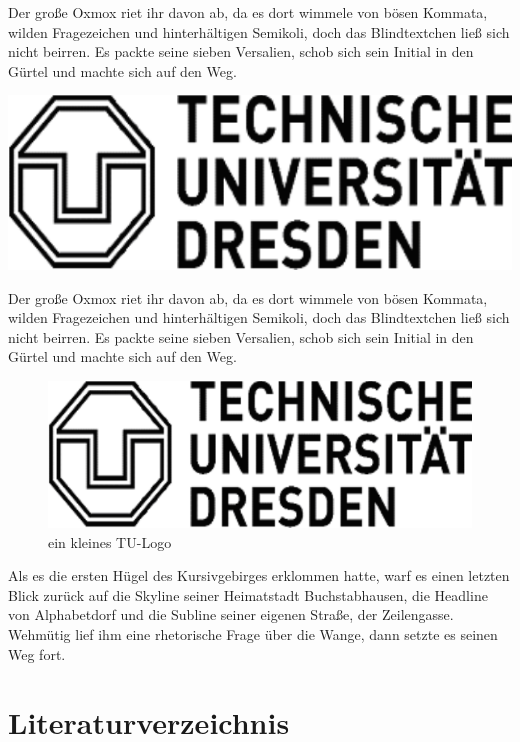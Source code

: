 \documentclass[%
	12pt,%
	a4paper,%
	oneside,%
	liststotoc, idxtotoc, bibtotoc, %
	parskip=half,%
	nochapterprefix,%
	appendixprefix, %
	headings=small,%
]{scrreprt}
\newcommand{\alt}[1]{}%
\begin{document}
Der große Oxmox riet ihr davon ab, da es dort wimmele von bösen Kommata, wilden Fragezeichen und hinterhältigen Semikoli, doch das Blindtextchen ließ sich nicht beirren. Es packte seine sieben Versalien, schob sich sein Initial in den Gürtel und machte sich auf den Weg. 

		\alt{Ich bin das Logo der Technischen Universität Dresden}
		\includegraphics[scale=0.10]{images/tu_logo}%

Der große Oxmox riet ihr davon ab, da es dort wimmele von bösen Kommata, wilden Fragezeichen und hinterhältigen Semikoli, doch das Blindtextchen ließ sich nicht beirren. Es packte seine sieben Versalien, schob sich sein Initial in den Gürtel und machte sich auf den Weg. 

\begin{figure}[htbp]
		\centering
		\alt{Ich bin das Logo der Technischen Universität Dresden}
		\includegraphics[scale=0.25]{images/tu_logo}%
	\caption{ein kleines TU-Logo}%
	\label{fig:kleinestulogo}
\end{figure}

Als es die ersten Hügel des Kursivgebirges erklommen hatte, warf es einen letzten Blick zurück auf die Skyline seiner Heimatstadt Buchstabhausen, die Headline von Alphabetdorf und die Subline seiner eigenen Straße, der Zeilengasse. Wehmütig lief ihm eine rhetorische Frage über die Wange, dann setzte es seinen Weg fort.

\chapter{Literaturverzeichnis}
\label{sec:Literaturverzeichnis}
\end{document}
